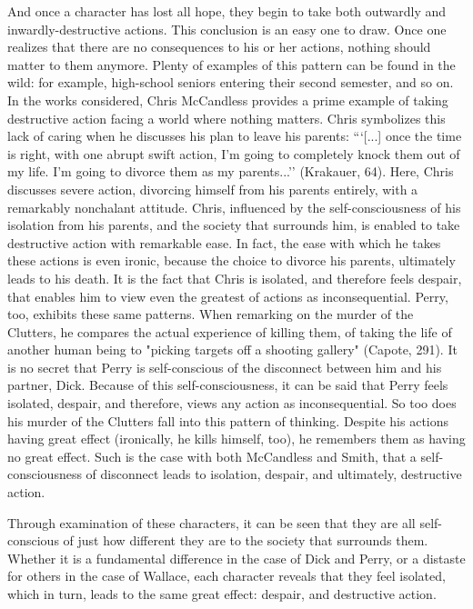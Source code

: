 \documentclass[12pt]{article}
\begin{document}
\begin{mla}
And once a character has lost all hope, they begin to take both outwardly and
inwardly-destructive actions. This conclusion is an easy one to draw. Once one
realizes that there are no consequences to his or her actions, nothing should
matter to them anymore. Plenty of examples of this pattern can be found in the
wild: for example, high-school seniors entering their second semester, and so
on. In the works considered, Chris McCandless provides a prime example of taking
destructive action facing a world where nothing matters. Chris symbolizes this
lack of caring when he discusses his plan to leave his parents: ```[...] once
the time is right, with one abrupt swift action, I'm going to completely knock
them out of my life. I'm going to divorce them as my parents...'' (Krakauer,
64). Here, Chris discusses severe action, divorcing himself from his parents
entirely, with a remarkably nonchalant attitude. Chris, influenced by the
self-consciousness of his isolation from his parents, and the society that
surrounds him, is enabled to take destructive action with remarkable ease. In
fact, the ease with which he takes these actions is even ironic, because the
choice to divorce his parents, ultimately leads to his death. It is the fact
that Chris is isolated, and therefore feels despair, that enables him to view
even the greatest of actions as inconsequential. Perry, too, exhibits these same
patterns. When remarking on the murder of the Clutters, he compares the actual
experience of killing them, of taking the life of another human being to
"picking targets off a shooting gallery" (Capote, 291). It is no secret that
Perry is self-conscious of the disconnect between him and his partner, Dick.
Because of this self-consciousness, it can be said that Perry feels isolated,
despair, and therefore, views any action as inconsequential. So too does his
murder of the Clutters fall into this pattern of thinking. Despite his actions
having great effect (ironically, he kills himself, too), he remembers them as
having no great effect. Such is the case with both McCandless and Smith, that a
self-consciousness of disconnect leads to isolation, despair, and ultimately,
destructive action.

Through examination of these characters, it can be seen that they are all
self-conscious of just how different they are to the society that surrounds
them. Whether it is a fundamental difference in the case of Dick and Perry, or a
distaste for others in the case of Wallace, each character reveals that they
feel isolated, which in turn, leads to the same great effect: despair, and
destructive action.


\end{mla}
\end{document}
